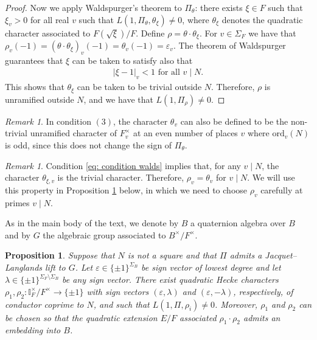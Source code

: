 \documentclass{amsart}
\newtheorem{proposition}[theorem]{Proposition}
\theoremstyle{definition}
\theoremstyle{remark}
\newtheorem{remark}[theorem]{Remark}
\numberwithin{equation}{section}
\newcommand{\ord}{\mathrm{ord}}
\newcommand{\I}{{\mathbb I}}
\begin{document}
\begin{proof}
Now we apply Waldspurger's theorem \cite[Th. 4]{Wa91} to $\Pi_\theta$: there exists $\xi\in F$ such that $\xi_v>0$ for all real $v$ such that $L(1,\Pi_\theta,\theta_\xi)\neq 0$, where $\theta_\xi$ denotes the quadratic character associated to $F(\sqrt{\xi})/F$. Define $\rho = \theta\cdot \theta_\xi$. For $v\in\Sigma_F$ we have that $\rho_v(-1)=(\theta\cdot \theta_\xi)_v(-1)=\theta_v(-1)=\varepsilon_v$. The theorem of Waldspurger guarantees that $\xi$ can be taken to satisfy also that
\begin{align}\label{eq: condition walds}
|\xi-1|_v<1 \text{ for all } v\mid N.  
\end{align}
 This shows that $\theta_\xi$ can be taken to be trivial outside $N$. Therefore, $\rho$ is unramified outside $N$, and we have that $L(1,\Pi_\rho)\neq 0$.
\end{proof}
\begin{remark}\label{rk:appendix}
  In condition $(3)$, the character $\theta_v$ can also be defined to be the non-trivial unramified character of $F_v^\times$ at an even number of places $v$ where $\ord_v(N)$ is odd, since this does not change the sign of $\Pi_\theta$. 
\end{remark}
\begin{remark}\label{rk:appendix2}
  Condition \ref{eq: condition walds} implies that, for any $v\mid N$, the character $\theta_{\xi,v}$ is the trivial character. Therefore, $\rho_v=\theta_v$ for $v\mid N$. We will use this property in Proposition \ref{prop:apendix second} below, in which we need to choose $\rho_v$ carefully at primes $v\mid N$.
\end{remark}

As in the main body of the text, we denote by $B$ a quaternion algebra over $B$ and by $G$ the algebraic group associated to $B^\times/F^\times$.
\begin{proposition}\label{prop:apendix second}
  Suppose that $N$ is not a square and that $\Pi$ admits a Jacquet--Langlands lift to $G$. Let $\varepsilon\in\{\pm 1\}^{\Sigma_B}$ be sign vector of lowest degree and let $\lambda\in\{\pm 1\}^{\Sigma_F\setminus\Sigma_B}$ be any sign vector. There exist quadratic Hecke characters $\rho_1,\rho_2:\I_F^\times/F^\times\rightarrow \{\pm 1\}$ with sign vectors $(\varepsilon,\lambda)$ and $(\varepsilon,-\lambda)$, respectively, of conductor coprime to $N$, and such that $L(1, \Pi, {\rho_i})\neq 0$. Moreover, $\rho_1$ and $\rho_2$ can be chosen so that the quadratic extension $E/F$ associated $\rho_1\cdot\rho_2$ admits an embedding into $B$.
\end{proposition}
\end{document}
